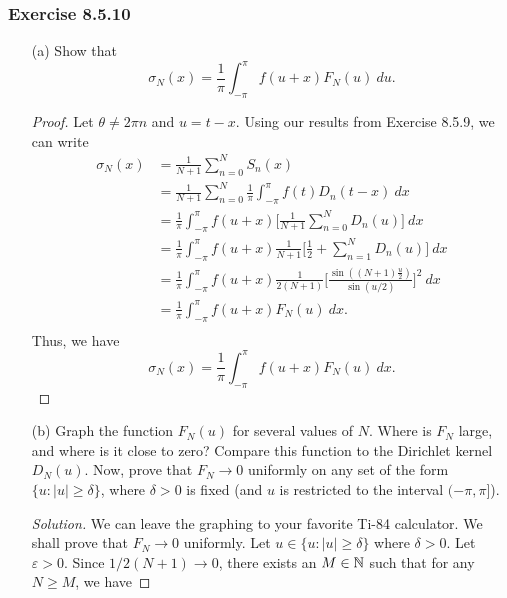 \subsubsection{Exercise 8.5.10} 
\begin{enumerate}
    \item[(a)] Show that 
        \[  \sigma_{N}(x) = \frac{ 1 }{ \pi  } \int_{ -\pi  }^{ \pi  } f(u+x) F_{N}(u)   \ du. \]
        \begin{proof}
        Let \( \theta \neq 2 \pi n \) and \( u = t - x   \). Using our results from Exercise 8.5.9, we can write 
        \begin{align*}
          \sigma_{N}(x)   &= \frac{ 1 }{ N+1 } \sum_{ n=0 }^{ N } S_{n}(x) \\
                    &= \frac{ 1 }{ N+1 } \sum_{ n=0  }^{ N } \frac{ 1 }{ \pi  } \int_{ -\pi  }^{ \pi  } f(t) D_{n}(t-x) \ dx \\ 
                    &= \frac{ 1 }{ \pi  } \int_{ -\pi  }^{ \pi  } f(u+x) \Big[  \frac{ 1  }{ N+1 } \sum_{ n=0  }^{ N  } D_{n}(u) \Big]  \ dx \\
                    &= \frac{ 1 }{ \pi  } \int_{ -\pi  }^{ \pi  } f(u+x) \frac{ 1 }{ N+1 } \Big[ \frac{ 1 }{ 2 } + \sum_{ n=1 }^{ N } D_{n}(u) \Big]   \ dx \\
                    &= \frac{ 1 }{ \pi  } \int_{ -\pi  }^{ \pi  } f(u+x) \frac{ 1 }{ 2(N+1) } \Big[\frac{ \sin((N+1)\frac{ u }{ 2 } ) }{ \sin(u/2) } \Big]^{2}  \ dx \\
                    &= \frac{ 1 }{ \pi  } \int_{ -\pi  }^{ \pi  } f(u+x) F_{N}(u) \ dx. \\
        \end{align*}
        Thus, we have
        \[  \sigma_{N}(x) = \frac{ 1 }{ \pi } \int_{ -\pi  }^{ \pi  } f(u+x) F_{N}(u) \ dx. \]
        \end{proof}
    \item[(b)] Graph the function \( F_{N}(u)  \) for several values of \( N \). Where is \( F_{N} \) large, and where is it close to zero? Compare this function to the Dirichlet kernel \( D_{N}(u)  \). Now, prove that \( F_{N} \to  0  \) uniformly on any set of the form \( \{ u: | u  | \geq \delta \}  \), where \( \delta > 0  \) is fixed (and \( u  \) is restricted to the interval \( (-\pi,\pi] \)). 
        \begin{proof}[Solution]
        We can leave the graphing to your favorite Ti-84 calculator. We shall prove that \( F_{N} \to 0  \) uniformly. Let \( u \in \{ u: | u  | \geq \delta \}  \) where \( \delta > 0  \). Let \( \varepsilon > 0  \). Since \( 1 / 2 (N+1) \to 0  \), there exists an \( M \in \mathbb{N}  \) such that for any \( N \geq M  \), we have 

\end{proof}
\end{enumerate}
